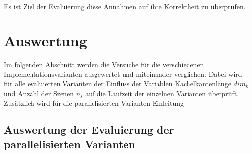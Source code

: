 Es ist Ziel der Evaluierung diese Annahmen auf ihre Korrektheit zu überprüfen.


\section{Auswertung}
Im folgenden Abschnitt werden die Versuche für die verschiedenen Implementationsvarianten ausgewertet und miteinander verglichen. Dabei wird für alle evaluierten Varianten der Einfluss der Variablen Kachelkantenlänge $dim_k$ und Anzahl der Szenen $n_s$ auf die Laufzeit der einzelnen Varianten überprüft. Zusätzlich wird für die parallelisierten Varianten 
Einleitung

\subsection{Auswertung der Evaluierung der parallelisierten Varianten}

